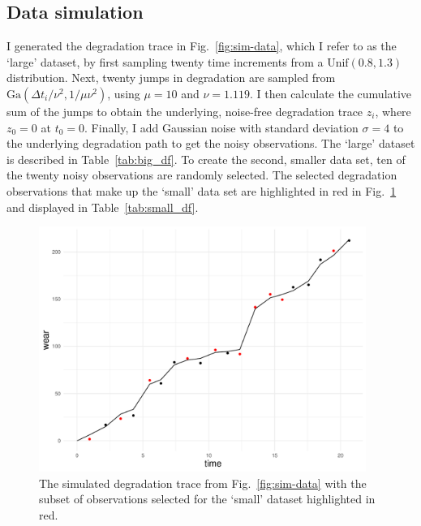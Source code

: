 \subsection{Data simulation}

I generated the degradation trace in Fig.~\ref{fig:sim-data}, which I refer to as the `large' dataset, by first sampling twenty time increments from a $\mbox{Unif}(0.8, 1.3)$ distribution. Next, twenty jumps in degradation are sampled from $\mbox{Ga}(\Delta t_i/\nu^2, 1/\mu\nu^2)$, using $\mu = 10$ and $\nu = 1.119$. I then calculate the cumulative sum of the jumps to obtain the underlying, noise-free degradation trace $z_i$, where $z_0 = 0$ at $t_0 = 0$. Finally, I add Gaussian noise with standard deviation $\sigma = 4$ to the underlying degradation path to get the noisy observations. The `large' dataset is described in Table~\ref{tab:big_df}. To create the second, smaller data set, ten of the twenty noisy observations are randomly selected. The selected degradation observations that make up the `small' data set are highlighted in red in Fig.~\ref{fig:sim-data-small} and displayed in Table~\ref{tab:small_df}.

\begin{figure}[tbp]
  \centering
  \includegraphics[width=0.95\textwidth]{./figures/ch-4/SimData_big_small.pdf}
  \caption{The simulated degradation trace from Fig.~\ref{fig:sim-data} with the subset of observations selected for the `small' dataset highlighted in red.}
  \label{fig:sim-data-small}
\end{figure}





